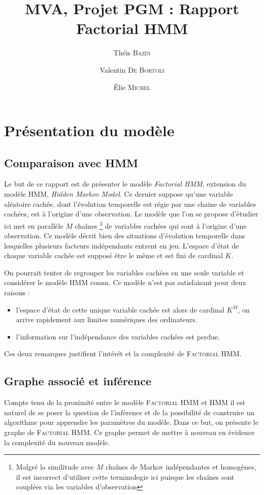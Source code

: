 \documentclass[10pt,a4paper]{article}
\title{MVA, Projet PGM : Rapport\\
  Factorial HMM}
\author{Théis \textsc{Bazin} \and Valentin \textsc{De Bortoli} \and Élie 
\textsc{Michel}}
\newcommand{\hmm}{\textsc{HMM}}
\newcommand{\fhmm}{\textsc{Factorial HMM}}
\begin{document}
\maketitle

\section{Présentation du modèle}
\subsection{Comparaison avec HMM}
Le but de ce rapport est de présenter le modèle \emph{Factorial HMM}, extension 
du modèle \hmm, \emph{Hidden Markov Model}. Ce dernier suppose qu'une variable 
aléatoire cachée, dont l'évolution temporelle est régie par une chaine de variables
cachées, est à l'origine d'une observation. Le modèle que l'on se 
propose d'étudier ici met en parallèle $M$ chaînes \footnote{Malgré la 
similitude avec $M$ chaînes de Markov indépendantes et homogènes, il est incorrect
d'utiliser cette terminologie ici puisque les chaînes sont couplées via les variables
d'observation} de variables cachées
 qui sont à l'origine d'une observation. Ce modèle décrit bien
des situations d'évolution temporelle dans lesquelles plusieurs facteurs 
indépendants entrent en jeu.
L'espace d'état de chaque variable cachée est  supposé être le même et est fini
de cardinal $K$.

On pourrait tenter de regrouper les variables cachées en une seule variable et
considérer le modèle  \hmm{} connu.
Ce modèle n'est pas satisfaisant pour deux raisons :

\begin{itemize}
  \item l'espace d'état de cette unique variable cachée est alors de cardinal 
    $K^M$, on arrive rapidement aux limites numériques des ordinateurs.
  \item l'information sur l'indépendance des variables cachées est perdue.
\end{itemize}

Ces deux remarques justifient l'intérêt et la complexité de \fhmm.

\subsection{Graphe associé et inférence} 
Compte tenu de la proximité entre le modèle \fhmm{} et \hmm{} il est naturel de 
se poser la question de l'inférence et de la possibilité de construire un
algorithme pour apprendre les paramètres du modèle.
Dans ce but, on présente le graphe de \fhmm.
Ce graphe permet de mettre à nouveau en évidence la complexité du nouveau 
modèle.
\end{document}
